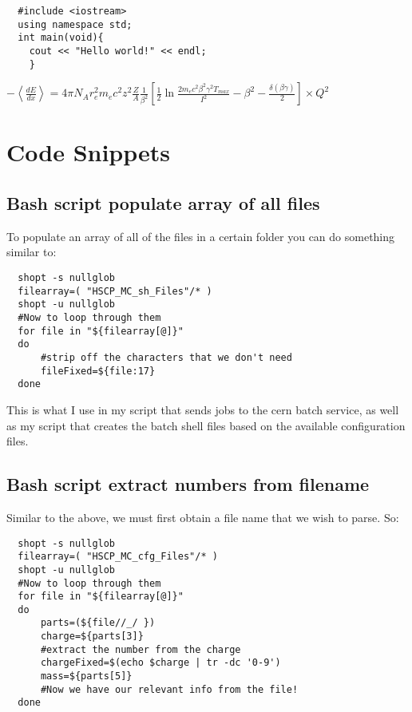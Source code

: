 \documentclass[11 pt , letterpaper , twoside , openright]{book}
\begin{document}
\lstset{language=cpp,label= ,caption= ,numbers=none}
\begin{lstlisting}
  #include <iostream>
  using namespace std;
  int main(void){
    cout << "Hello world!" << endl;
    }
\end{lstlisting}

$-\left<\frac{dE}{dx}\right>=4\pi
        N_{A}r_{e}^2m_{e}c^2z^2\frac{Z}{A}\frac{1}{\beta^2}\left[\frac{1}{2}\ln\frac{2m_ec^2\beta^2\gamma^2T_{max}}{I^2}-\beta^2-\frac{\delta(\beta\gamma)}{2}\right]\times
        Q^2$




\part{Code Snippets}
\label{sec-3}
\chapter{Bash script populate array of all files}
\label{sec-3-1}

To populate an array of all of the files in a certain folder you
can do something similar to:
\lstset{language=sh,label= ,caption= ,numbers=none}
\begin{lstlisting}
  shopt -s nullglob
  filearray=( "HSCP_MC_sh_Files"/* )
  shopt -u nullglob
  #Now to loop through them
  for file in "${filearray[@]}"
  do
      #strip off the characters that we don't need
      fileFixed=${file:17}
  done
\end{lstlisting}
This is what I use in my script that sends jobs to the cern batch
service, as well as my script that creates the batch shell files
based on the available configuration files.
\chapter{Bash script extract numbers from filename}
\label{sec-3-2}

Similar to the above, we must first obtain a file name that we wish
to parse. So:
\lstset{language=sh,label= ,caption= ,numbers=none}
\begin{lstlisting}
  shopt -s nullglob
  filearray=( "HSCP_MC_cfg_Files"/* )
  shopt -u nullglob
  #Now to loop through them
  for file in "${filearray[@]}"
  do
      parts=(${file//_/ })
      charge=${parts[3]}
      #extract the number from the charge
      chargeFixed=$(echo $charge | tr -dc '0-9')
      mass=${parts[5]}
      #Now we have our relevant info from the file!
  done
\end{lstlisting}
\end{document}
